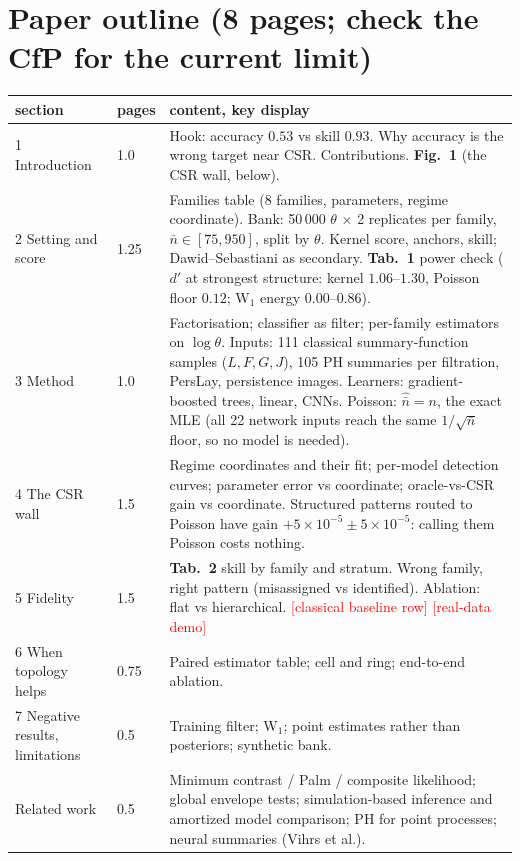 \documentclass[11pt]{article}
\newcommand{\nb}{\bar n}
\newcommand{\pending}[1]{\textcolor{red}{[#1]}}
\begin{document}
\section*{Paper outline (8 pages; check the CfP for the current limit)}

\begin{tabularx}{\linewidth}{@{}p{3.6cm}p{0.9cm}X@{}}
\toprule
section & pages & content, key display \\
\midrule
1 Introduction & 1.0 & Hook: accuracy $0.53$ vs skill $0.93$. Why accuracy is the wrong target near CSR. Contributions.
  \textbf{Fig.~1} (the CSR wall, below). \\
2 Setting and score & 1.25 & Families table (8 families, parameters, regime coordinate). Bank: 50\,000 $\theta$ $\times$ 2
  replicates per family, $\nb\in[75,950]$, split by $\theta$. Kernel score, anchors, skill; Dawid--Sebastiani
  as secondary. \textbf{Tab.~1} power check ($d'$ at strongest structure: kernel $1.06$--$1.30$, Poisson floor
  $0.12$; W$_1$ energy $0.00$--$0.86$). \\
3 Method & 1.0 & Factorisation; classifier as filter; per-family estimators on $\log\theta$. Inputs: 111
  classical summary-function samples ($L,F,G,J$), 105 PH summaries per filtration, PersLay, persistence images.
  Learners: gradient-boosted trees, linear, CNNs. Poisson: $\hat{\nb}=n$, the exact MLE (all 22 network inputs
  reach the same $1/\sqrt{\nb}$ floor, so no model is needed). \\
4 The CSR wall & 1.5 & Regime coordinates and their fit; per-model detection curves; parameter error vs coordinate;
  oracle-vs-CSR gain vs coordinate. Structured patterns routed to Poisson have gain $+5{\times}10^{-5}\pm5{\times}10^{-5}$:
  calling them Poisson costs nothing. \\
5 Fidelity & 1.5 & \textbf{Tab.~2} skill by family and stratum. Wrong family, right pattern (misassigned vs
  identified). Ablation: flat vs hierarchical. \pending{classical baseline row} \pending{real-data demo} \\
6 When topology helps & 0.75 & Paired estimator table; cell and ring; end-to-end ablation. \\
7 Negative results, limitations & 0.5 & Training filter; W$_1$; point estimates rather than posteriors;
  synthetic bank. \\
Related work & 0.5 & Minimum contrast / Palm / composite likelihood; global envelope tests; simulation-based
  inference and amortized model comparison; PH for point processes; neural summaries (Vihrs et al.). \\
\bottomrule
\end{tabularx}
\end{document}
